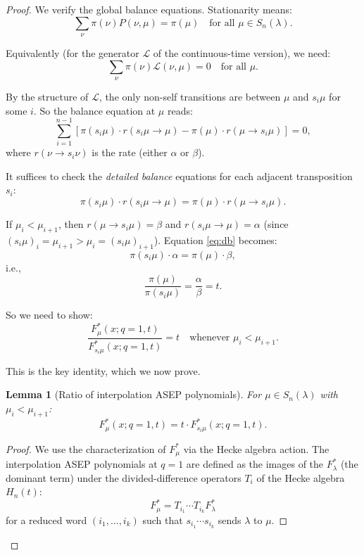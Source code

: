 \documentclass[12pt]{article}
\newtheorem{lemma}[theorem]{Lemma}
\begin{document}
\begin{proof}
We verify the global balance equations. Stationarity means:
\[
\sum_{\nu} \pi(\nu) P(\nu, \mu) = \pi(\mu) \quad \text{for all } \mu \in S_n(\lambda).
\]

Equivalently (for the generator $\mathcal{L}$ of the continuous-time version), we need:
\[
\sum_{\nu} \pi(\nu) \mathcal{L}(\nu, \mu) = 0 \quad \text{for all } \mu.
\]

By the structure of $\mathcal{L}$, the only non-self transitions are between $\mu$ and $s_i\mu$ for some $i$. So the balance equation at $\mu$ reads:
\[
\sum_{i=1}^{n-1} \left[\pi(s_i\mu) \cdot r(s_i\mu \to \mu) - \pi(\mu) \cdot r(\mu \to s_i\mu)\right] = 0,
\]
where $r(\nu \to s_i\nu)$ is the rate (either $\alpha$ or $\beta$).

It suffices to check the \emph{detailed balance} equations for each adjacent transposition $s_i$:
\begin{equation}\label{eq:db}
\pi(s_i \mu) \cdot r(s_i\mu \to \mu) = \pi(\mu) \cdot r(\mu \to s_i\mu).
\end{equation}

If $\mu_i < \mu_{i+1}$, then $r(\mu \to s_i\mu) = \beta$ and $r(s_i\mu \to \mu) = \alpha$ (since $(s_i\mu)_i = \mu_{i+1} > \mu_i = (s_i\mu)_{i+1}$). Equation \eqref{eq:db} becomes:
\[
\pi(s_i\mu) \cdot \alpha = \pi(\mu) \cdot \beta,
\]
i.e.,
\[
\frac{\pi(\mu)}{\pi(s_i\mu)} = \frac{\alpha}{\beta} = t.
\]

So we need to show:
\begin{equation}\label{eq:ratio}
\frac{F^*_\mu(x; q{=}1, t)}{F^*_{s_i\mu}(x; q{=}1, t)} = t \quad \text{whenever } \mu_i < \mu_{i+1}.
\end{equation}

This is the key identity, which we now prove.

\begin{lemma}[Ratio of interpolation ASEP polynomials]\label{lem:ratio}
For $\mu \in S_n(\lambda)$ with $\mu_i < \mu_{i+1}$:
\[
F^*_\mu(x; q{=}1, t) = t \cdot F^*_{s_i\mu}(x; q{=}1, t).
\]
\end{lemma}

\begin{proof}
We use the characterization of $F^*_\mu$ via the Hecke algebra action. The interpolation ASEP polynomials at $q=1$ are defined as the images of the $F^*_\lambda$ (the dominant term) under the divided-difference operators $T_i$ of the Hecke algebra $H_n(t)$:
\[
F^*_\mu = T_{i_1} \cdots T_{i_k} F^*_\lambda
\]
for a reduced word $(i_1, \ldots, i_k)$ such that $s_{i_1} \cdots s_{i_k}$ sends $\lambda$ to $\mu$.


\end{proof}
\end{proof}
\end{document}
